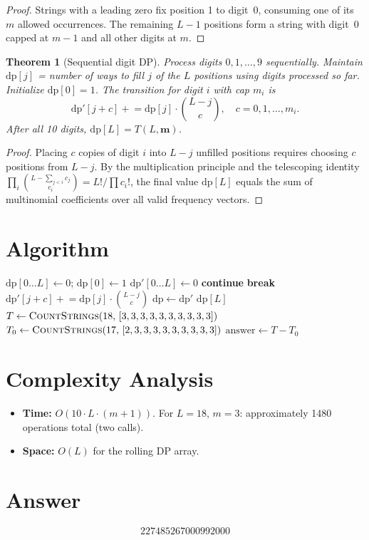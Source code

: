 \documentclass[11pt]{article}
\newtheorem{theorem}{Theorem}
\begin{document}
\begin{proof}
Strings with a leading zero fix position 1 to digit~0, consuming one of its $m$ allowed occurrences. The remaining $L-1$ positions form a string with digit~0 capped at $m-1$ and all other digits at $m$.
\end{proof}

\begin{theorem}[Sequential digit DP]
Process digits $0,1,\ldots,9$ sequentially. Maintain $\mathrm{dp}[j]$ = number of ways to fill $j$ of the $L$ positions using digits processed so far. Initialize $\mathrm{dp}[0]=1$. The transition for digit $i$ with cap $m_i$ is
\[
\mathrm{dp}'[j+c] \mathrel{+}= \mathrm{dp}[j]\cdot\binom{L-j}{c},\quad c=0,1,\ldots,m_i.
\]
After all 10 digits, $\mathrm{dp}[L] = T(L,\mathbf{m})$.
\end{theorem}

\begin{proof}
Placing $c$ copies of digit $i$ into $L-j$ unfilled positions requires choosing $c$ positions from $L-j$. By the multiplication principle and the telescoping identity $\prod_i \binom{L-\sum_{j<i}c_j}{c_i} = L!/\prod c_i!$, the final value $\mathrm{dp}[L]$ equals the sum of multinomial coefficients over all valid frequency vectors.
\end{proof}

\section{Algorithm}

\begin{algorithmic}[1]
    \State $\mathrm{dp}[0\ldots L] \gets 0$;\; $\mathrm{dp}[0] \gets 1$
        \State $\mathrm{dp}'[0\ldots L] \gets 0$
             \textbf{continue} \EndIf
                 \textbf{break} \EndIf
                \State $\mathrm{dp}'[j{+}c] \mathrel{+}= \mathrm{dp}[j]\cdot\binom{L-j}{c}$
            \EndFor
        \EndFor
        \State $\mathrm{dp} \gets \mathrm{dp}'$
    \EndFor
    \State \Return $\mathrm{dp}[L]$
\EndFunction
\State $T \gets \Call{CountStrings}{18,\,[3,3,3,3,3,3,3,3,3,3]}$
\State $T_0 \gets \Call{CountStrings}{17,\,[2,3,3,3,3,3,3,3,3,3]}$
\State $\text{answer} \gets T - T_0$
\end{algorithmic}

\section{Complexity Analysis}

\begin{itemize}
    \item \textbf{Time:} $O(10 \cdot L \cdot (m{+}1))$. For $L=18$, $m=3$: approximately 1480 operations total (two calls).
    \item \textbf{Space:} $O(L)$ for the rolling DP array.
\end{itemize}

\section{Answer}

\[
\boxed{227485267000992000}
\]
\end{document}
